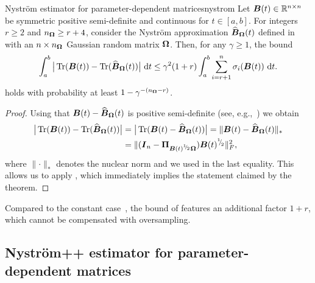 \begin{theorem}{Nyström estimator for parameter-dependent matrices}{nystrom}
    Let $\boldsymbol{B}(t) \in \mathbb{R}^{n \times n}$ be symmetric positive semi-definite and continuous for $t \in [a, b]$. For integers $r \geq 2$ and $n_{\boldsymbol{\Omega}} \geq r + 4$, consider the Nystr\"om approximation $\widehat{\boldsymbol{B}}_{\boldsymbol{\Omega}}(t)$ defined in~ with an $n\times n_{\boldsymbol{\Omega}}$ Gaussian random matrix $\boldsymbol{\Omega}$. Then, for any $\gamma \geq 1$, the bound 
    \[
        \int_{a}^{b} \big| \operatorname{Tr}(\boldsymbol{B}(t)) - \operatorname{Tr}(\widehat{\boldsymbol{B}}_{\boldsymbol{\Omega}}(t)) \big| ~\mathrm{d}t
        \leq \gamma^2 (1 + r) \int_{a}^{b} \sum_{i = r+1}^{n} \sigma_i(\boldsymbol{B}(t)) ~\mathrm{d}t.
    \]
    holds with probability at least $1 - \gamma^{-(n_{\boldsymbol{\Omega}} - r)}$.
\end{theorem}
\begin{proof}
Using that $\boldsymbol{B}(t) - \widehat{\boldsymbol{B}}_{\boldsymbol{\Omega}}(t)$ is positive semi-definite (see, e.g.,~\cite[Lemma 2.1]{frangella-2023-randomized-nystrom}) we obtain
    \begin{align*}
        \big| \operatorname{Tr}(\boldsymbol{B}(t)) - \operatorname{Tr}(\widehat{\boldsymbol{B}}_{\boldsymbol{\Omega}}(t)) \big|
        & = \big| \operatorname{Tr}(\boldsymbol{B}(t) - \widehat{\boldsymbol{B}}_{\boldsymbol{\Omega}}(t)) \big|
        = \lVert \boldsymbol{B}(t) - \widehat{\boldsymbol{B}}_{\boldsymbol{\Omega}}(t) \rVert _{\ast} \\
        & = \lVert (\boldsymbol{I}_n - \boldsymbol{\Pi}_{\boldsymbol{B}(t)^{{}^{1}{\mskip -5mu/\mskip -3mu}_{2}} \boldsymbol{\Omega}}) \boldsymbol{B}(t)^{{}^{1}{\mskip -5mu/\mskip -3mu}_{2}} \rVert _F^2,
    \end{align*}
    where $\lVert \cdot \rVert _{\ast}$ denotes the nuclear norm and we used \cite[Theorem 1]{gittens-2011-spectral-norm} in the last equality. This allows us to apply \cite[Theorem 5]{kressner-2024-randomized-lowrank}, which immediately implies the statement claimed by the theorem.
\end{proof}

Compared to the constant case~\cite[Theorem 8.1]{tropp-2023-randomized-algorithms}, the bound of  features an additional factor $1+r$, which cannot be compensated with oversampling.

\subsection{Nyström++ estimator for parameter-dependent matrices}
\label{subsec:nystrom-pp}



